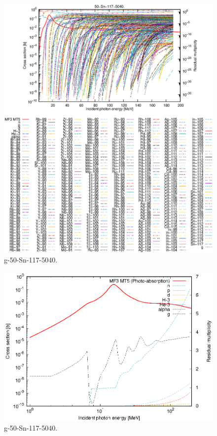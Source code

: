 \begin{figure}
 \includegraphics[width=\linewidth]{eps/g_50-Sn-117_5040.eps}
  \caption{g-50-Sn-117-5040.}
\end{figure}
\newpage \clearpage

\begin{figure}
 \includegraphics[width=\linewidth]{eps-log/g_50-Sn-117_5040.eps}
 \caption{g-50-Sn-117-5040.}
\end{figure}
\newpage \clearpage

